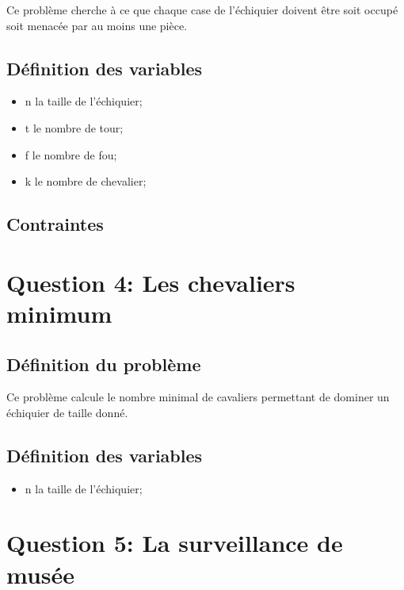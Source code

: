 \documentclass[letterpaper]{article}
\begin{document}
Ce problème cherche à ce que chaque case de l'échiquier doivent être soit
occupé soit menacée par au moins une pièce.

\subsection{Définition des variables}

\begin{itemize}
   \item n la taille de l'échiquier;
   \item t le nombre de tour;
   \item f le nombre de fou;
   \item k le nombre de chevalier;
\end{itemize}

\subsection{Contraintes}

\section{Question 4: Les chevaliers minimum}

\subsection{Définition du problème}

Ce problème calcule le nombre minimal de cavaliers permettant de dominer
un échiquier de taille donné.

\subsection{Définition des variables}

\begin{itemize}
   \item n la taille de l'échiquier;
\end{itemize}

\section{Question 5: La surveillance de musée}
\end{document}
